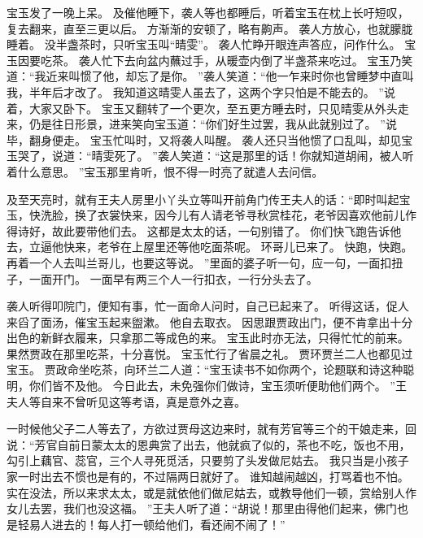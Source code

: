 \par
宝玉发了一晚上呆。
及催他睡下，袭人等也都睡后，听着宝玉在枕上长吁短叹，复去翻来，直至三更以后。
方渐渐的安顿了，略有齁声。
袭人方放心，也就朦胧睡着。
没半盏茶时，只听宝玉叫“晴雯”。
袭人忙睁开眼连声答应，问作什么。
宝玉因要吃茶。
袭人忙下去向盆内蘸过手，从暖壶内倒了半盏茶来吃过。
宝玉乃笑道：“我近来叫惯了他，却忘了是你。
”袭人笑道：“他一乍来时你也曾睡梦中直叫我，半年后才改了。
我知道这晴雯人虽去了，这两个字只怕是不能去的。
”说着，大家又卧下。
宝玉又翻转了一个更次，至五更方睡去时，只见晴雯从外头走来，仍是往日形景，进来笑向宝玉道：“你们好生过罢，我从此就别过了。
”说毕，翻身便走。
宝玉忙叫时，又将袭人叫醒。
袭人还只当他惯了口乱叫，却见宝玉哭了，说道：“晴雯死了。
”袭人笑道：“这是那里的话！你就知道胡闹，被人听着什么意思。
”宝玉那里肯听，恨不得一时亮了就遣人去问信。
\par
及至天亮时，就有王夫人房里小丫头立等叫开前角门传王夫人的话：“即时叫起宝玉，快洗脸，换了衣裳快来，因今儿有人请老爷寻秋赏桂花，老爷因喜欢他前儿作得诗好，故此要带他们去。
这都是太太的话，一句别错了。
你们快飞跑告诉他去，立逼他快来，老爷在上屋里还等他吃面茶呢。
环哥儿已来了。
快跑，快跑。
再着一个人去叫兰哥儿，也要这等说。
”里面的婆子听一句，应一句，一面扣扭子，一面开门。
一面早有两三个人一行扣衣，一行分头去了。
\par
袭人听得叩院门，便知有事，忙一面命人问时，自己已起来了。
听得这话，促人来舀了面汤，催宝玉起来盥漱。
他自去取衣。
因思跟贾政出门，便不肯拿出十分出色的新鲜衣履来，只拿那二等成色的来。
宝玉此时亦无法，只得忙忙的前来。
果然贾政在那里吃茶，十分喜悦。
宝玉忙行了省晨之礼。
贾环贾兰二人也都见过宝玉。
贾政命坐吃茶，向环兰二人道：“宝玉读书不如你两个，论题联和诗这种聪明，你们皆不及他。
今日此去，未免强你们做诗，宝玉须听便助他们两个。
”王夫人等自来不曾听见这等考语，真是意外之喜。
\par
一时候他父子二人等去了，方欲过贾母这边来时，就有芳官等三个的干娘走来，回说：“芳官自前日蒙太太的恩典赏了出去，他就疯了似的，茶也不吃，饭也不用，勾引上藕官、蕊官，三个人寻死觅活，只要剪了头发做尼姑去。
我只当是小孩子家一时出去不惯也是有的，不过隔两日就好了。
谁知越闹越凶，打骂着也不怕。
实在没法，所以来求太太，或是就依他们做尼姑去，或教导他们一顿，赏给别人作女儿去罢，我们也没这福。
”王夫人听了道：“胡说！那里由得他们起来，佛门也是轻易人进去的！每人打一顿给他们，看还闹不闹了！”\par
